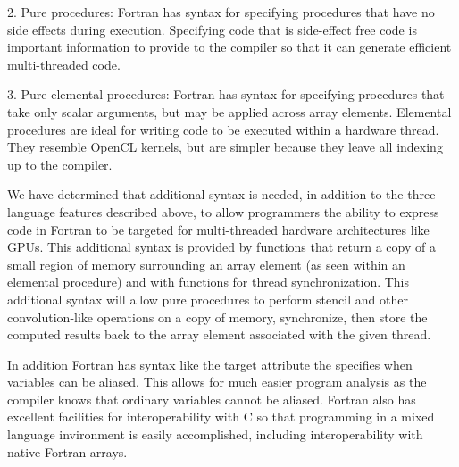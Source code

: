 2. Pure procedures:  Fortran has syntax for specifying procedures that have no side effects during execution.  Specifying code that is side-effect free code is important information to provide to the compiler so that it can generate efficient multi-threaded code.

3. Pure elemental procedures: Fortran has syntax for specifying procedures that take only scalar arguments, but may be applied across array elements.  Elemental procedures are ideal for writing code to be executed within a hardware thread.  They resemble OpenCL kernels, but are simpler because they leave all indexing up to the compiler.

We have determined that additional syntax is needed, in addition to the three language features described above, to allow programmers the ability to express code in Fortran to be targeted for multi-threaded hardware architectures like GPUs.  This additional syntax is provided by functions that return a copy of a small region of memory surrounding an array element (as seen within an elemental procedure) and with functions for thread synchronization.  This additional syntax will allow pure procedures to perform stencil and other convolution-like operations on a copy of memory, synchronize, then store the computed results back to the array element associated with the given thread.

In addition Fortran has syntax like the target attribute the specifies when variables can be aliased.  This allows for much easier program analysis as the compiler knows that ordinary variables cannot be aliased.  Fortran also has excellent facilities for interoperability with C so that programming in a mixed language invironment is easily accomplished, including interoperability with native Fortran arrays.
